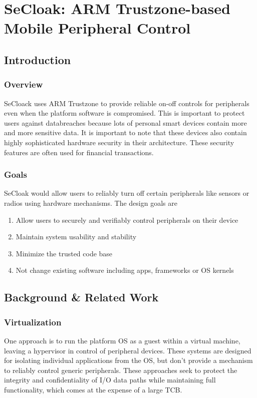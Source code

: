 \documentclass{article}
\begin{document}
\section{SeCloak: ARM Trustzone-based Mobile Peripheral Control}

\subsection{Introduction}

\subsubsection{Overview}

SeCloack uses ARM Trustzone to provide reliable on-off controls for peripherals even when the platform software is compromised. This is important to protect users against databreaches because lots of personal smart devices contain more and more sensitive data. It is important to note that these devices also contain highly sophisticated hardware security in their architecture. These security features are often used for financial transactions.

\subsubsection{Goals}

SeCloak would allow users to reliably turn off certain peripherals like sensors or radios using hardware mechanisms. The design goals are \begin{enumerate}
\item Allow users to securely and verifiably control peripherals on their device
\item Maintain system usability and stability
\item Minimize the trusted code base
\item Not change existing software including apps, frameworks or OS kernels
\end{enumerate}

\subsection{Background \& Related Work}

\subsubsection{Virtualization}

One approach is to run the platform OS as a guest within a virtual machine, leaving a hypervisor in control of peripheral devices. These systems are designed for isolating individual applications from the OS, but don't provide a mechanism to reliably control generic peripherals. These approaches seek to protect the integrity and confidentiality of I/O data paths while maintaining full functionality, which comes at the expense of a large TCB.
\end{document}
